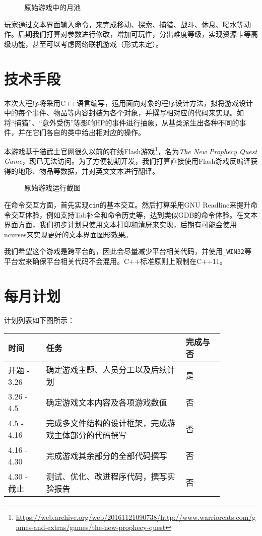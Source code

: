 \documentclass[hyperref,UTF8,a4paper]{ctexart}
\newcommand{\includegraphicx}[1]{\maxsizebox{\textwidth}{\textheight}{\texttt{[image: \#1]}}}
\begin{document}
\begin{figure}[H]
\centering
\includegraphicx{img/moonpool.jpg}
\caption{原始游戏中的月池}
\end{figure}

玩家通过文本界面输入命令，来完成移动、探索、捕猎、战斗、休息、喝水等动作。后期我们打算对参数进行修改，增加可玩性，分出难度等级，实现资源卡等高级功能，甚至可以考虑网络联机游戏（形式未定）。

\hypertarget{ux6280ux672fux624bux6bb5}{%
\section{技术手段}\label{ux6280ux672fux624bux6bb5}}

本次大程序将采用C++语言编写，运用面向对象的程序设计方法，拟将游戏设计中的每个事件、物品等内容封装为各个对象，并撰写相对应的代码来实现。如将``捕猎''、``意外受伤''等影响HP的事件进行抽象，从基类派生出各种不同的事件，并在它们各自的类中给出相对应的操作。

本游戏基于猫武士官网很久以前的在线Flash游戏\footnote{\url{https://web.archive.org/web/20161121090738/http://www.warriorcats.com/games-and-extras/games/the-new-prophecy-quest}}，名为\emph{The
New Prophecy Quest
Game}，现已无法访问。为了方便初期开发，我们打算直接使用Flash游戏反编译获得的地形、物品等数据，并对英文文本进行翻译。

\begin{figure}[H]
\centering
\includegraphicx{img/origin.png}
\caption{原始游戏运行截图}
\end{figure}

在命令交互方面，首先实现\texttt{cin}的基本交互。然后打算采用GNU
Readline来提升命令交互体验，例如支持Tab补全和命令历史等，达到类似GDB的命令体验。在文本界面方面，我们初步计划只使用文本打印和清屏来实现，后期有可能会使用ncurses来实现更好的文本界面图形效果。

我们希望这个游戏是跨平台的，因此会尽量减少平台相关代码，并使用\texttt{\_WIN32}等平台宏来确保平台相关代码不会混用。C++标准原则上限制在C++11。

\hypertarget{ux6bcfux6708ux8ba1ux5212}{%
\section{每月计划}\label{ux6bcfux6708ux8ba1ux5212}}

计划列表如下图所示：

\begin{longtable}[]{p{0.15\linewidth}p{0.55\linewidth}p{0.15\linewidth}}
\toprule
时间 & 任务 & 完成与否\tabularnewline
\midrule
\endhead
开题 - 3.26 & 确定游戏主题、人员分工以及后续计划 & 是\tabularnewline
3.26 - 4.5 & 确定游戏文本内容及各项游戏数值 & 否\tabularnewline
4.5 - 4.16 & 完成多文件结构的设计框架，完成游戏主体部分的代码撰写 &
否\tabularnewline
4.16 - 4.30 & 完成游戏其余部分的全部代码撰写 & 否\tabularnewline
4.30 - 截止 & 测试、优化、改进程序代码，撰写实验报告 & 否\tabularnewline
\bottomrule
\end{longtable}
\end{document}
